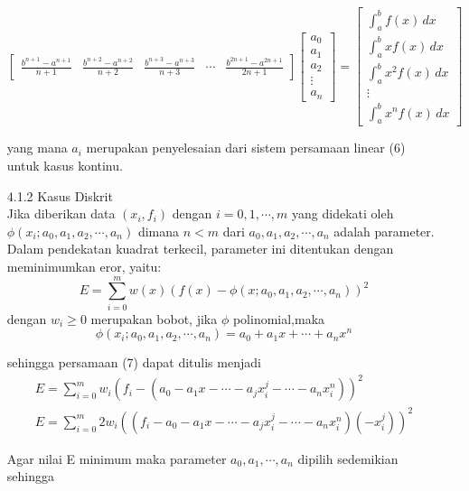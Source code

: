 \documentclass[a4paper,12pt]{article}
\begin{document}
\begin{enumerate}
{\begin{equation}
\begin{bmatrix}
			\frac{b^{n+1}-a^{n+1}}{n+1} & \frac{b^{n+2}-a^{n+2}}{n+2} & \frac{b^{n+3}-a^{n+3}}{n+3} & \cdots & \frac{b^{2n+1}-a^{2n+1}}{2n+1}
		\end{bmatrix}
		\begin{bmatrix}
			a_{0}\\
			a_{1}\\ 
			a_{2}\\
			\vdots\\ 
			a_{n}  
		\end{bmatrix}
		=
		\begin{bmatrix}
			\int_{a}^{b} f(x)\, dx\\
			\int_{a}^{b} xf(x)\, dx\\ 
			\int_{a}^{b} x^2f(x)\, dx\\
			\vdots\\ 
			\int_{a}^{b} x^nf(x)\, dx
		\end{bmatrix}
	\end{equation}
}

yang mana $a_i$ merupakan penyelesaian dari sistem persamaan linear (6) untuk kasus kontinu.\\

\vspace{0.5cm}
	\item [4.1.2] Kasus Diskrit \\
Jika diberikan data $(x_i,f_i)$ dengan $i=0,1,\cdots,m$ yang didekati oleh $\phi (x_i;a_0,a_1,a_2,\cdots,a_n)$
dimana $n<m$ dari $a_0,a_1,a_2,\cdots,a_n$ adalah parameter. Dalam pendekatan kuadrat terkecil, parameter ini ditentukan dengan meminimumkan eror, yaitu:
\begin{equation}
	E=  \sum_{i=0}^m w(x)(f(x)-\phi(x;a_0,a_1,a_2,\cdots,a_n))^2
\end{equation}
dengan $w_i \geq 0$ merupakan bobot, jika $\phi$ polinomial,maka 
\begin{equation}
	\phi(x_i;a_0,a_1,a_2,\cdots,a_n)=a_0+a_1 x+\cdots+a_n x^n
\end{equation}

sehingga persamaan (7) dapat ditulis menjadi
\begin{equation}
	\begin{split}
		E=  \sum_{i=0}^m w_i(f_i-(a_0-a_1 x-\cdots-a_j x_i^j-\cdots-a_n x_i^n))^2\\
		E=  \sum_{i=0}^m 2w_i((f_i-a_0-a_1 x-\cdots-a_j x_i^j-\cdots-a_n x_i^n)(-x_i^j))^2
	\end{split}
\end{equation}

Agar nilai E minimum maka parameter $a_0,a_1,\cdots,a_n$ dipilih sedemikian sehingga 


\end{enumerate}
\end{document}

